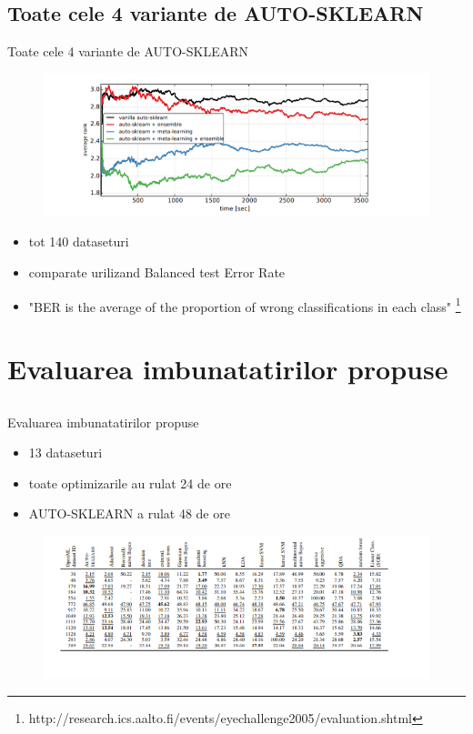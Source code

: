 \documentclass{beamer}
\begin{document}
	\subsection{Toate cele 4 variante de AUTO-SKLEARN}
	\begin{frame}{Toate cele 4 variante de AUTO-SKLEARN}
		\begin{figure}[H]
			\centering
			\includegraphics[scale=0.6]{grafic_cmp.png}
		\end{figure}	
		\begin{itemize}
			\item tot 140 dataseturi
			\item comparate urilizand  Balanced test Error Rate 
			\item "BER is the average of the proportion of wrong classifications in each class"  \footnote{http://research.ics.aalto.fi/events/eyechallenge2005/evaluation.shtml}
		\end{itemize}
		
	\end{frame}
	
	
\section{Evaluarea imbunatatirilor propuse}
	\subsection{}
	\begin{frame}{Evaluarea imbunatatirilor propuse}
		\begin{itemize}
			\item 13 dataseturi
			\item toate optimizarile au rulat 24 de ore
			\item AUTO-SKLEARN a rulat 48 de ore
		\end{itemize}
		\begin{figure}[H]
			\centering
			\includegraphics[scale=0.75]{tabel_performante.png}
		\end{figure}	
		
		
	\end{frame}
	
\end{document}
